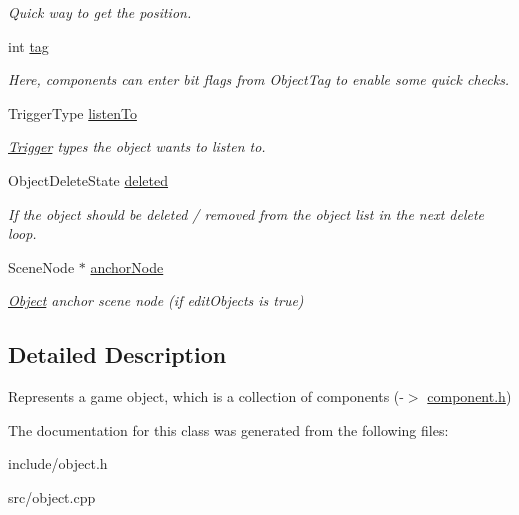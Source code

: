\begin{DoxyCompactItemize}
\begin{DoxyCompactList}\small\item\em \-Quick way to get the position. \end{DoxyCompactList}\item 
\hypertarget{classObject_afd5675ae29e7e79c2d39f0d21fc92fa2}{
int \hyperlink{classObject_afd5675ae29e7e79c2d39f0d21fc92fa2}{tag}}
\label{d8/d4b/classObject_afd5675ae29e7e79c2d39f0d21fc92fa2}

\begin{DoxyCompactList}\small\item\em \-Here, components can enter bit flags from \-Object\-Tag to enable some quick checks. \end{DoxyCompactList}\item 
\hypertarget{classObject_aeaeabbec837aa3b66f2591798e006ed2}{
\-Trigger\-Type \hyperlink{classObject_aeaeabbec837aa3b66f2591798e006ed2}{listen\-To}}
\label{d8/d4b/classObject_aeaeabbec837aa3b66f2591798e006ed2}

\begin{DoxyCompactList}\small\item\em \hyperlink{classTrigger}{\-Trigger} types the object wants to listen to. \end{DoxyCompactList}\item 
\hypertarget{classObject_a35d64b5d4f34d6d9a9dc6ee2a04d39dc}{
\-Object\-Delete\-State \hyperlink{classObject_a35d64b5d4f34d6d9a9dc6ee2a04d39dc}{deleted}}
\label{d8/d4b/classObject_a35d64b5d4f34d6d9a9dc6ee2a04d39dc}

\begin{DoxyCompactList}\small\item\em \-If the object should be deleted / removed from the object list in the next delete loop. \end{DoxyCompactList}\item 
\hypertarget{classObject_a07e90f915ed305aee66a34f67702900a}{
\-Scene\-Node $\ast$ \hyperlink{classObject_a07e90f915ed305aee66a34f67702900a}{anchor\-Node}}
\label{d8/d4b/classObject_a07e90f915ed305aee66a34f67702900a}

\begin{DoxyCompactList}\small\item\em \hyperlink{classObject}{\-Object} anchor scene node (if edit\-Objects is true) \end{DoxyCompactList}\end{DoxyCompactItemize}


\subsection{\-Detailed \-Description}
\-Represents a game object, which is a collection of components (-\/$>$ \hyperlink{component_8h_source}{component.\-h}) 

\-The documentation for this class was generated from the following files\-:\begin{DoxyCompactItemize}
\item 
include/object.\-h\item 
src/object.\-cpp\end{DoxyCompactItemize}
